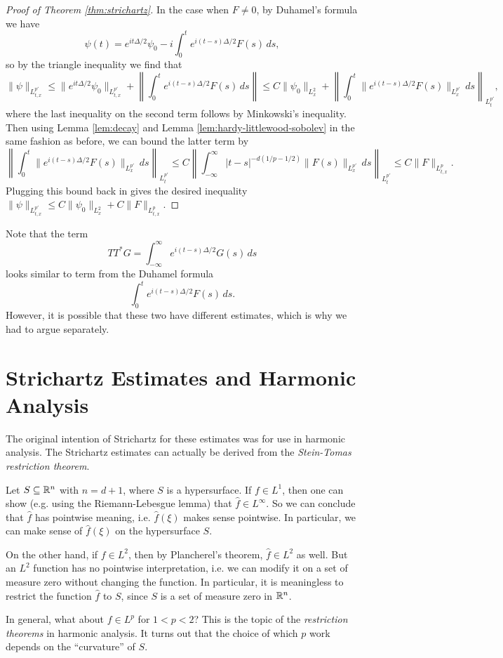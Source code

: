 \begin{proof}[Proof of Theorem \ref{thm:strichartz}]
  In the case when $F \ne 0$, by Duhamel's formula
  we have
  \[
    \psi(t) = e^{it \Delta / 2} \psi_0
    - i \int_0^t e^{i(t - s) \Delta / 2} F(s)\, ds,
  \]
  so by the triangle inequality we find that
  \[
    \|\psi\|_{L^{p'}_{t, x}}
    \le \|e^{it \Delta / 2} \psi_0\|_{L^{p'}_{t, x}}
    + \left\|
    \int_0^t e^{i(t - s) \Delta / 2} F(s)\, ds
    \right\|
    \le C \|\psi_0\|_{L^2_x}
    + \left\| \int_0^t \|e^{i(t - s)\Delta / 2} F(s)\|_{L^{p'}_x}\, ds \right\|_{L^{p'}_t},
  \]
  where the last inequality on the second term
  follows by Minkowski's inequality. Then using
  Lemma \ref{lem:decay} and Lemma \ref{lem:hardy-littlewood-sobolev} in the same fashion as before, we can bound
  the latter term by
  \[
    \left\| \int_0^t \|e^{i(t - s)\Delta / 2} F(s)\|_{L^{p'}_x}\, ds \right\|_{L^{p'}_t}
    \le
    C \left\| \int_{-\infty}^\infty |t - s|^{-d (1 / p - 1 / 2)} \|F(s)\|_{L^{p'}_x}\, ds \right\|_{L^{p'}_t}
    \le C \|F\|_{L^p_{t, x}}.
  \]
  Plugging this bound back in gives the desired
  inequality $\|\psi\|_{L^{p'}_{t, x}} \le C \|\psi_0\|_{L^2_x} + C \|F\|_{L^p_{t, x}}$.
\end{proof}

\begin{remark}
  Note that the term
  \[
    TT^* G = \int_{-\infty}^\infty e^{i(t - s) \Delta / 2} G(s)\, ds
  \]
  looks similar to term from the Duhamel formula
  \[
    \int_0^t e^{i(t - s) \Delta / 2} F(s)\, ds.
  \]
  However, it is possible that these two have
  different estimates, which is why we had to
  argue separately.
\end{remark}

\section{Strichartz Estimates and Harmonic Analysis}
\begin{remark}
  The original intention of Strichartz for these
  estimates was for use in harmonic analysis.
  The Strichartz estimates can actually be derived
  from the \emph{Stein-Tomas restriction theorem}.

  Let $S \subseteq \mathbb{R}^n$ with $n = d + 1$, where
  $S$ is a hypersurface.
  If $f \in L^1$, then one can show (e.g.
  using the Riemann-Lebesgue lemma) that
  $\widehat{f} \in L^\infty$. So we can conclude that
  $\widehat{f}$ has pointwise meaning, i.e.
  $\widehat{f}(\xi)$ makes sense pointwise. In
  particular, we can make sense of $\widehat{f}(\xi)$
  on the hypersurface $S$.

  On the other hand, if $f \in L^2$, then by Plancherel's theorem,
  $\widehat{f} \in L^2$ as well. But
  an $L^2$ function has no pointwise interpretation,
  i.e. we can modify it on a set of measure zero without
  changing the function.
  In particular, it is meaningless to restrict
  the function $\widehat{f}$ to $S$, since $S$ is a set
  of measure zero in $\mathbb{R}^n$.

  In general, what about $f \in L^p$ for
  $1 < p < 2$? This is the topic of the
  \emph{restriction theorems} in harmonic analysis.
  It turns out that the choice of which $p$ work
  depends on the ``curvature'' of $S$.
\end{remark}

